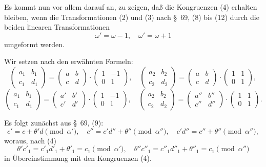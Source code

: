 \documentclass[12pt,a4paper]{article}
\theoremstyle{definition}
\begin{document}
Es kommt nun vor allem darauf an, zu zeigen, daß die Kongruenzen (4) erhalten bleiben, wenn die Transformationen (2) und (3) nach \S\ 69, (8) bis (12) durch die beiden linearen Transformationen
\[
\omega' = \omega - 1, \quad \omega' = \omega + 1
\]
umgeformt werden.

Wir setzen nach den erwähnten Formeln:
\[
\begin{pmatrix} a_1 & b_1 \\ c_1 & d_1 \end{pmatrix} = \begin{pmatrix} a & b \\ c & d \end{pmatrix} \cdot \begin{pmatrix} 1 & -1 \\ 0 & 1 \end{pmatrix}, \quad \begin{pmatrix} a_2 & b_2 \\ c_2 & d_2 \end{pmatrix} = \begin{pmatrix} a & b \\ c & d \end{pmatrix} \cdot \begin{pmatrix} 1 & 1 \\ 0 & 1 \end{pmatrix},
\]
\begin{equation}\label{eq:76-5}
\begin{pmatrix} a_1 & b_1 \\ c_1 & d_1 \end{pmatrix} = \begin{pmatrix} a' & b' \\ c' & d' \end{pmatrix} \cdot \begin{pmatrix} 1 & -1 \\ 0 & 1 \end{pmatrix}, \quad \begin{pmatrix} a_2 & b_2 \\ c_2 & d_2 \end{pmatrix} = \begin{pmatrix} a'' & b'' \\ c'' & d'' \end{pmatrix} \cdot \begin{pmatrix} 1 & 1 \\ 0 & 1 \end{pmatrix}.
\end{equation}

Es folgt zunächst aus \S\ 69, (9):
\[
c' = c + \theta' d \pmod{\alpha'}, \quad c'' = c' d'' + \theta'' \pmod{\alpha''}, \quad c'd'' = c'' + \theta'' \pmod{\alpha''},
\]
woraus, nach (4)
\[
\theta' c'_1 = c'_1 d'_1 + \theta'_1 = c_1 \pmod{\alpha'}, \quad \theta'' c''_1 = c''_1 d''_1 + \theta''_1 = c_1 \pmod{\alpha''}
\]
in Übereinstimmung mit den Kongruenzen (4).
\end{document}
